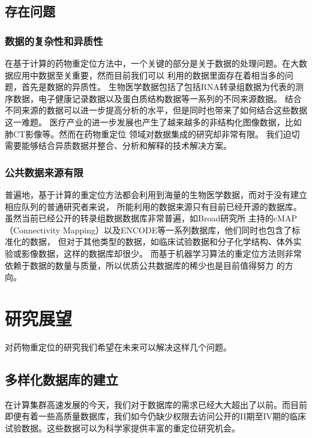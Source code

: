 \subsection{存在问题}

\subsubsection{数据的复杂性和异质性}
在基于计算的药物重定位方法中，一个关键的部分是关于数据的处理问题。在大数据应用中数据至关重要，然而目前我们可以
利用的数据里面存在着相当多的问题，首先是数据的异质性\cite{gligorijevicIntegrativeMethodsAnalyzing2016, chenIBMWatsonHow2016}。
生物医学数据包括了包括RNA转录组数据为代表的测序数据，电子健康记录数据以及蛋白质结构数据等一系列的不同来源数据。
结合不同来源的数据可以进一步提高分析的水平，但是同时也带来了如何结合这些数据这一难题。
医疗产业的进一步发展也产生了越来越多的非结构化图像数据，比如肺CT影像等。然而在药物重定位
领域对数据集成的研究却非常有限\cite{napolitanoDrugRepositioningMachinelearning2013}。
我们迫切需要能够结合异质数据并整合、分析和解释的技术解决方案。

\subsubsection{公共数据来源有限}
普遍地，基于计算的重定位方法都会利用到海量的生物医学数据，而对于没有建立相应队列的普通研究者来说，
所能利用的数据来源只有目前已经开源的数据库。虽然当前已经公开的转录组数据数据库非常普遍，如Broad研究所
主持的cMAP（Connectivity Mapping）以及ENCODE等一系列数据库，他们同时也包含了标准化的数据，
但对于其他类型的数据，如临床试验数据和分子化学结构、体外实验或影像数据，这样的数据库却很少\cite{pushpakomDrugRepurposingProgress2019}。
而基于机器学习算法的重定位方法则非常依赖于数据的数量与质量，所以优质公共数据库的稀少也是目前值得努力
的方向。

\section{研究展望}
对药物重定位的研究我们希望在未来可以解决这样几个问题。

\subsection{多样化数据库的建立}
在计算集群高速发展的今天，我们对于数据库的需求已经大大超出了以前。而目前即便有着一些高质量数据库，我们如今仍缺少权限去访问公开的II期至IV期的临床试验数据。这些数据可以为科学家提供丰富的重定位研究机会\cite{pushpakomDrugRepurposingProgress2019}。

